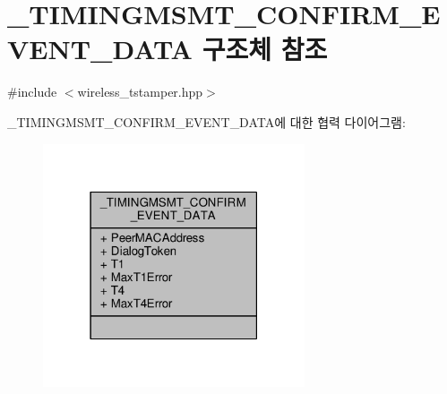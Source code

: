\hypertarget{struct___t_i_m_i_n_g_m_s_m_t___c_o_n_f_i_r_m___e_v_e_n_t___d_a_t_a}{}\section{\+\_\+\+T\+I\+M\+I\+N\+G\+M\+S\+M\+T\+\_\+\+C\+O\+N\+F\+I\+R\+M\+\_\+\+E\+V\+E\+N\+T\+\_\+\+D\+A\+TA 구조체 참조}
\label{struct___t_i_m_i_n_g_m_s_m_t___c_o_n_f_i_r_m___e_v_e_n_t___d_a_t_a}


{\ttfamily \#include $<$wireless\+\_\+tstamper.\+hpp$>$}



\+\_\+\+T\+I\+M\+I\+N\+G\+M\+S\+M\+T\+\_\+\+C\+O\+N\+F\+I\+R\+M\+\_\+\+E\+V\+E\+N\+T\+\_\+\+D\+A\+T\+A에 대한 협력 다이어그램\+:
\nopagebreak
\begin{figure}[H]
\begin{center}
\leavevmode
\includegraphics[width=219pt]{struct___t_i_m_i_n_g_m_s_m_t___c_o_n_f_i_r_m___e_v_e_n_t___d_a_t_a__coll__graph}
\end{center}
\end{figure}
